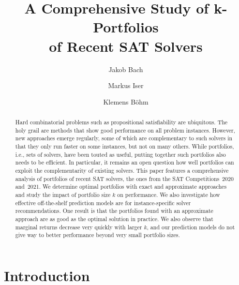 \documentclass[runningheads]{llncs}
\begin{document}
\title{A Comprehensive Study of k-Portfolios\\ of Recent SAT Solvers}

\author{
	Jakob Bach \and %
	Markus Iser \and
	Klemens Böhm
}



\maketitle

\begin{abstract}
Hard combinatorial problems such as propositional satisfiability are ubiquitous. 
The holy grail are methods that show good performance on all problem instances. 
However, new approaches emerge regularly, some of which are complementary to such solvers in that they only run faster on some instances, but not on many others. 
While portfolios, i.e., sets of solvers, have been touted as useful, putting together such portfolios also needs to be efficient. 
In particular, it remains an open question how well portfolios can exploit the complementarity of existing solvers. 
This paper features a comprehensive analysis of portfolios of recent SAT solvers, the ones from the SAT Competitions~2020 and~2021. 
We determine optimal portfolios with exact and approximate approaches and study the impact of portfolio size $k$ on performance. 
We also investigate how effective off-the-shelf prediction models are for instance-specific solver recommendations.
One result is that the portfolios found with an approximate approach are as good as the optimal solution in practice. 
We also observe that marginal returns decrease very quickly with larger $k$, and our prediction models do not give way to better performance beyond very small portfolio sizes. 

\end{abstract}

\section{Introduction}
\label{sec:introduction}
\end{document}
